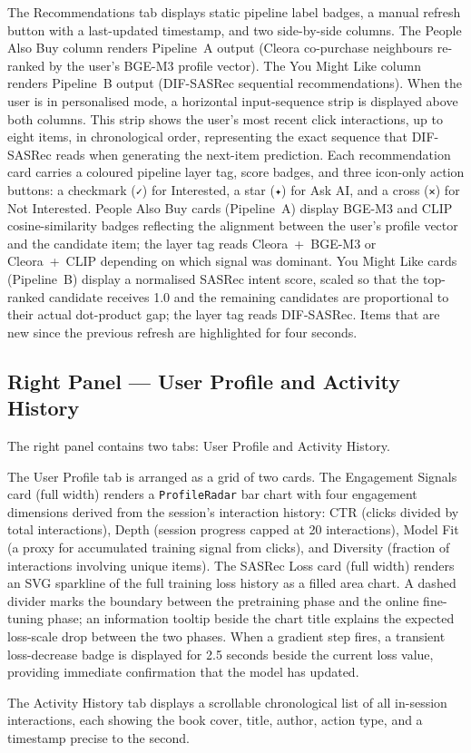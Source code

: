 The Recommendations tab displays static pipeline label badges, a manual refresh button with a last-updated timestamp, and two side-by-side columns.
The People Also Buy column renders Pipeline~A output (Cleora co-purchase neighbours re-ranked by the user's BGE-M3 profile vector).
The You Might Like column renders Pipeline~B output (DIF-SASRec sequential recommendations).
When the user is in personalised mode, a horizontal input-sequence strip is displayed above both columns.
This strip shows the user's most recent click interactions, up to eight items, in chronological order, representing the exact sequence that DIF-SASRec reads when generating the next-item prediction.
Each recommendation card carries a coloured pipeline layer tag, score badges, and three icon-only action buttons: a checkmark (\texttt{✓}) for Interested, a star (\texttt{✦}) for Ask AI, and a cross (\texttt{✕}) for Not Interested.
People Also Buy cards (Pipeline~A) display BGE-M3 and CLIP cosine-similarity badges reflecting the alignment between the user's profile vector and the candidate item; the layer tag reads Cleora~+~BGE-M3 or Cleora~+~CLIP depending on which signal was dominant.
You Might Like cards (Pipeline~B) display a normalised SASRec intent score, scaled so that the top-ranked candidate receives 1.0 and the remaining candidates are proportional to their actual dot-product gap; the layer tag reads DIF-SASRec.
Items that are new since the previous refresh are highlighted for four seconds.

\subsection{Right Panel — User Profile and Activity History}
\label{sec:app_profile_panel}

The right panel contains two tabs: User Profile and Activity History.

The User Profile tab is arranged as a grid of two cards.
The Engagement Signals card (full width) renders a \texttt{ProfileRadar} bar chart with four engagement dimensions derived from the session's interaction history: CTR (clicks divided by total interactions), Depth (session progress capped at 20 interactions), Model Fit (a proxy for accumulated training signal from clicks), and Diversity (fraction of interactions involving unique items).
The SASRec Loss card (full width) renders an SVG sparkline of the full training loss history as a filled area chart.
A dashed divider marks the boundary between the pretraining phase and the online fine-tuning phase; an information tooltip beside the chart title explains the expected loss-scale drop between the two phases.
When a gradient step fires, a transient loss-decrease badge is displayed for 2.5 seconds beside the current loss value, providing immediate confirmation that the model has updated.

The Activity History tab displays a scrollable chronological list of all in-session interactions, each showing the book cover, title, author, action type, and a timestamp precise to the second.
